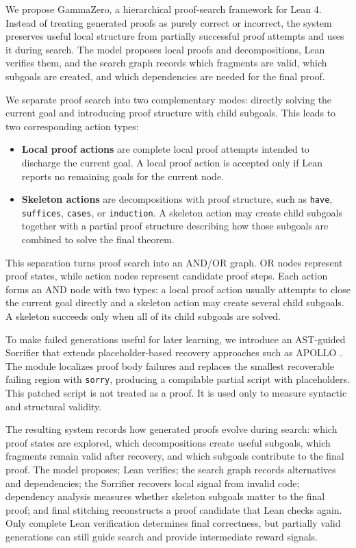 We propose GammaZero, a hierarchical proof-search framework for Lean 4. Instead of treating generated proofs as purely correct or incorrect, the system preserves useful local structure from partially successful proof attempts and uses it during search. The model proposes local proofs and decompositions, Lean verifies them, and the search graph records which fragments are valid, which subgoals are created, and which dependencies are needed for the final proof. 

We separate proof search into two complementary modes: directly solving the current goal and introducing proof structure with child subgoals. This leads to two corresponding action types:
\begin{itemize}
  \item \textbf{Local proof actions} are complete local proof attempts intended to discharge the current goal. A local proof action is accepted only if Lean reports no remaining goals for the current node.
  \item \textbf{Skeleton actions} are decompositions with proof structure, such as \texttt{have}, \texttt{suffices}, \texttt{cases}, or \texttt{induction}. A skeleton action may create child subgoals together with a partial proof structure describing how those subgoals are combined to solve the final theorem.
\end{itemize}

This separation turns proof search into an AND/OR graph. OR nodes represent proof states, while action nodes represent candidate proof steps. Each action forms an AND node with two types: a local proof action usually attempts to close the current goal directly and a skeleton action may create several child subgoals. A skeleton succeeds only when all of its child subgoals are solved.

To make failed generations useful for later learning, we introduce an AST-guided Sorrifier that extends placeholder-based recovery approaches such as APOLLO \cite{apollo}. The module localizes proof body failures and replaces the smallest recoverable failing region with \texttt{sorry}, producing a compilable partial script with placeholders. This patched script is not treated as a proof. It is used only to measure syntactic and structural validity.

The resulting system records how generated proofs evolve during search: which proof states are explored, which decompositions create useful subgoals, which fragments remain valid after recovery, and which subgoals contribute to the final proof.
The model proposes; Lean verifies; the search graph records alternatives and dependencies; the
Sorrifier recovers local signal from invalid code; dependency analysis measures whether skeleton
subgoals matter to the final proof; and final stitching reconstructs a proof candidate that Lean checks
again. Only complete Lean verification determines final correctness, but partially valid generations can still guide search and provide intermediate reward signals.


